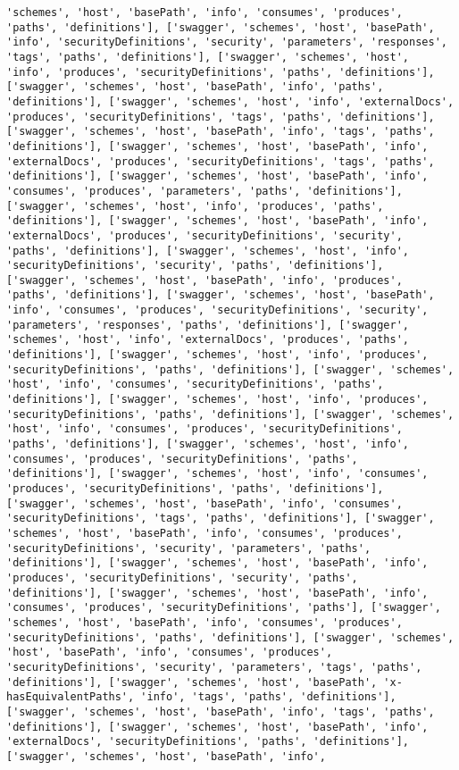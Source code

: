 \documentclass[11pt]{article}
\begin{document}
\begin{Verbatim}[commandchars=\\\{\}]
'schemes', 'host', 'basePath', 'info', 'consumes', 'produces', 'paths', 'definitions'], ['swagger', 'schemes', 'host', 'basePath', 'info', 'securityDefinitions', 'security', 'parameters', 'responses', 'tags', 'paths', 'definitions'], ['swagger', 'schemes', 'host', 'info', 'produces', 'securityDefinitions', 'paths', 'definitions'], ['swagger', 'schemes', 'host', 'basePath', 'info', 'paths', 'definitions'], ['swagger', 'schemes', 'host', 'info', 'externalDocs', 'produces', 'securityDefinitions', 'tags', 'paths', 'definitions'], ['swagger', 'schemes', 'host', 'basePath', 'info', 'tags', 'paths', 'definitions'], ['swagger', 'schemes', 'host', 'basePath', 'info', 'externalDocs', 'produces', 'securityDefinitions', 'tags', 'paths', 'definitions'], ['swagger', 'schemes', 'host', 'basePath', 'info', 'consumes', 'produces', 'parameters', 'paths', 'definitions'], ['swagger', 'schemes', 'host', 'info', 'produces', 'paths', 'definitions'], ['swagger', 'schemes', 'host', 'basePath', 'info', 'externalDocs', 'produces', 'securityDefinitions', 'security', 'paths', 'definitions'], ['swagger', 'schemes', 'host', 'info', 'securityDefinitions', 'security', 'paths', 'definitions'], ['swagger', 'schemes', 'host', 'basePath', 'info', 'produces', 'paths', 'definitions'], ['swagger', 'schemes', 'host', 'basePath', 'info', 'consumes', 'produces', 'securityDefinitions', 'security', 'parameters', 'responses', 'paths', 'definitions'], ['swagger', 'schemes', 'host', 'info', 'externalDocs', 'produces', 'paths', 'definitions'], ['swagger', 'schemes', 'host', 'info', 'produces', 'securityDefinitions', 'paths', 'definitions'], ['swagger', 'schemes', 'host', 'info', 'consumes', 'securityDefinitions', 'paths', 'definitions'], ['swagger', 'schemes', 'host', 'info', 'produces', 'securityDefinitions', 'paths', 'definitions'], ['swagger', 'schemes', 'host', 'info', 'consumes', 'produces', 'securityDefinitions', 'paths', 'definitions'], ['swagger', 'schemes', 'host', 'info', 'consumes', 'produces', 'securityDefinitions', 'paths', 'definitions'], ['swagger', 'schemes', 'host', 'info', 'consumes', 'produces', 'securityDefinitions', 'paths', 'definitions'], ['swagger', 'schemes', 'host', 'basePath', 'info', 'consumes', 'securityDefinitions', 'tags', 'paths', 'definitions'], ['swagger', 'schemes', 'host', 'basePath', 'info', 'consumes', 'produces', 'securityDefinitions', 'security', 'parameters', 'paths', 'definitions'], ['swagger', 'schemes', 'host', 'basePath', 'info', 'produces', 'securityDefinitions', 'security', 'paths', 'definitions'], ['swagger', 'schemes', 'host', 'basePath', 'info', 'consumes', 'produces', 'securityDefinitions', 'paths'], ['swagger', 'schemes', 'host', 'basePath', 'info', 'consumes', 'produces', 'securityDefinitions', 'paths', 'definitions'], ['swagger', 'schemes', 'host', 'basePath', 'info', 'consumes', 'produces', 'securityDefinitions', 'security', 'parameters', 'tags', 'paths', 'definitions'], ['swagger', 'schemes', 'host', 'basePath', 'x-hasEquivalentPaths', 'info', 'tags', 'paths', 'definitions'], ['swagger', 'schemes', 'host', 'basePath', 'info', 'tags', 'paths', 'definitions'], ['swagger', 'schemes', 'host', 'basePath', 'info', 'externalDocs', 'securityDefinitions', 'paths', 'definitions'], ['swagger', 'schemes', 'host', 'basePath', 'info', 
\end{Verbatim}
\end{document}
